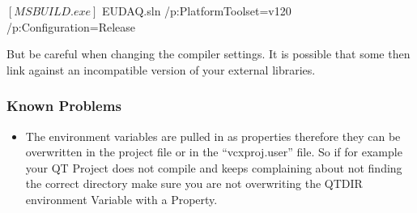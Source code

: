      \begin{listing}[mybash]
$[MSBUILD.exe]$ EUDAQ.sln /p:PlatformToolset=v120 /p:Configuration=Release
\end{listing}

But be careful when changing the compiler settings. It is possible that some then link against an incompatible version of your external libraries. 

\subsubsection{Known Problems}

\begin{itemize}
\item The environment variables are pulled in as properties therefore they can be overwritten in the project file or in the ``vcxproj.user'' file. So if for example your QT Project does not compile and keeps complaining about not finding the correct directory make sure you are not overwriting the QTDIR environment Variable with a Property. 
\end{itemize}
